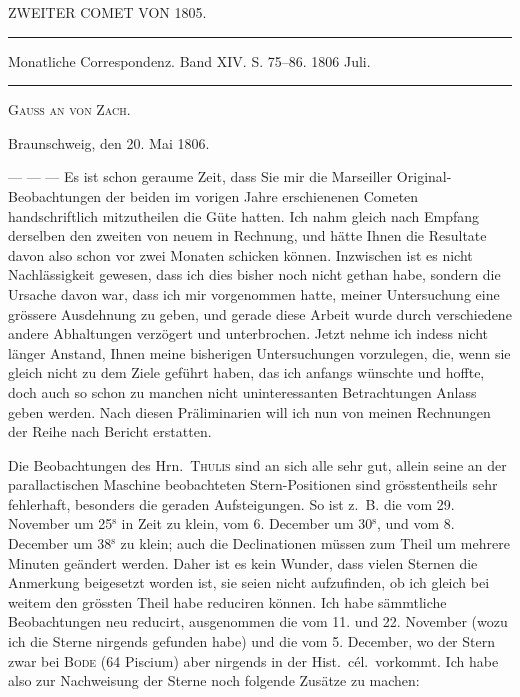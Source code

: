 \clearpage
{}
\hypertarget{native-275-lower}{}
\begin{center}
ZWEITER COMET VON 1805.

\rule{0.6\linewidth}{0.4pt}

Monatliche Correspondenz. Band XIV. S. 75–86. 1806 Juli.

\rule{0.6\linewidth}{0.4pt}

\textsc{Gauss an von Zach.}
\end{center}
\begin{flushright}
Braunschweig, den 20. Mai 1806.
\end{flushright}

\par\indent --- --- --- Es ist schon geraume Zeit, dass Sie mir die Marseiller Original-Beobachtungen der beiden im vorigen Jahre erschienenen Cometen handschriftlich mitzutheilen die Güte hatten. Ich nahm gleich nach Empfang derselben den zweiten von neuem in Rechnung, und hätte Ihnen die Resultate davon also schon vor zwei Monaten schicken können. Inzwischen ist es nicht Nachlässigkeit gewesen, dass ich dies bisher noch nicht gethan habe, sondern die Ursache davon war, dass ich mir vorgenommen hatte, meiner Untersuchung eine grössere Ausdehnung zu geben, und gerade diese Arbeit wurde durch verschiedene andere Abhaltungen verzögert und unterbrochen. Jetzt nehme ich indess nicht länger Anstand, Ihnen meine bisherigen Untersuchungen vorzulegen, die, wenn sie gleich nicht zu dem Ziele geführt haben, das ich anfangs wünschte und hoffte, doch auch so schon zu manchen nicht uninteressanten Betrachtungen Anlass geben werden. Nach diesen Präliminarien will ich nun von meinen Rechnungen der Reihe nach Bericht erstatten.

\par\indent Die Beobachtungen des Hrn.~\textsc{Thulis} sind an sich alle sehr gut, allein seine an der parallactischen Maschine beobachteten Stern-Positionen sind grösstentheils sehr fehlerhaft, besonders die geraden Aufsteigungen. So ist z.~B. die vom 29. November um 25$^{\mathrm{s}}$ in Zeit zu klein, vom 6. December um 30$^{\mathrm{s}}$, und vom 8. December um 38$^{\mathrm{s}}$ zu klein; auch die Declinationen müssen zum Theil um mehrere Minuten geändert werden. Daher ist es kein Wunder, dass vielen Sternen die Anmerkung beigesetzt worden ist, sie seien nicht aufzufinden, ob ich gleich bei weitem den grössten Theil habe reduciren können. Ich habe sämmtliche Beobachtungen neu reducirt, ausgenommen die vom 11. und 22. November (wozu ich
%
die Sterne nirgends gefunden habe) und die vom 5. December, wo der Stern zwar bei \textsc{Bode} (64 Piscium)
aber nirgends in der Hist.\ cél.\ vorkommt. Ich habe also zur Nachweisung der Sterne noch folgende
Zusätze zu machen:

